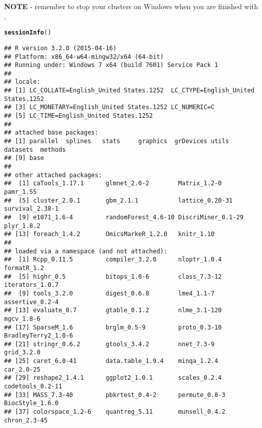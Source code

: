 \documentclass[12pt]{article}\usepackage[]{graphicx}\usepackage[usenames,dvipsnames]{color}
\makeatletter
\newcommand{\hlstd}[1]{\textcolor[rgb]{0.345,0.345,0.345}{#1}}%
\newcommand{\hlkwd}[1]{\textcolor[rgb]{0.737,0.353,0.396}{\textbf{#1}}}%
\newenvironment{kframe}{%
 \def\at@end@of@kframe{}%
 \ifinner\ifhmode%
  \def\at@end@of@kframe{\end{minipage}}%
  \begin{minipage}{\columnwidth}%
 \fi\fi%
 \def\FrameCommand##1{\hskip\@totalleftmargin \hskip-\fboxsep
 \colorbox{shadecolor}{##1}\hskip-\fboxsep
     \hskip-\linewidth \hskip-\@totalleftmargin \hskip\columnwidth}%
 \MakeFramed {\advance\hsize-\width
   \@totalleftmargin\z@ \linewidth\hsize
   \@setminipage}}%
 {\par\unskip\endMakeFramed%
 \at@end@of@kframe}
\newenvironment{knitrout}{}{} %
\makeatother
\begin{document}
\textbf{NOTE} - remember to stop your clusters on Windows when you are finished 
with .

\newpage
\begin{knitrout}
\color{fgcolor}\begin{kframe}
\begin{alltt}
\hlkwd{sessionInfo}\hlstd{()}
\end{alltt}
\begin{verbatim}
## R version 3.2.0 (2015-04-16)
## Platform: x86_64-w64-mingw32/x64 (64-bit)
## Running under: Windows 7 x64 (build 7601) Service Pack 1
## 
## locale:
## [1] LC_COLLATE=English_United States.1252  LC_CTYPE=English_United States.1252   
## [3] LC_MONETARY=English_United States.1252 LC_NUMERIC=C                          
## [5] LC_TIME=English_United States.1252    
## 
## attached base packages:
## [1] parallel  splines   stats     graphics  grDevices utils     datasets  methods  
## [9] base     
## 
## other attached packages:
##  [1] caTools_1.17.1      glmnet_2.0-2        Matrix_1.2-0        pamr_1.55          
##  [5] cluster_2.0.1       gbm_2.1.1           lattice_0.20-31     survival_2.38-1    
##  [9] e1071_1.6-4         randomForest_4.6-10 DiscriMiner_0.1-29  plyr_1.8.2         
## [13] foreach_1.4.2       OmicsMarkeR_1.2.0   knitr_1.10         
## 
## loaded via a namespace (and not attached):
##  [1] Rcpp_0.11.5         compiler_3.2.0      nloptr_1.0.4        formatR_1.2        
##  [5] highr_0.5           bitops_1.0-6        class_7.3-12        iterators_1.0.7    
##  [9] tools_3.2.0         digest_0.6.8        lme4_1.1-7          assertive_0.2-4    
## [13] evaluate_0.7        gtable_0.1.2        nlme_3.1-120        mgcv_1.8-6         
## [17] SparseM_1.6         brglm_0.5-9         proto_0.3-10        BradleyTerry2_1.0-6
## [21] stringr_0.6.2       gtools_3.4.2        nnet_7.3-9          grid_3.2.0         
## [25] caret_6.0-41        data.table_1.9.4    minqa_1.2.4         car_2.0-25         
## [29] reshape2_1.4.1      ggplot2_1.0.1       scales_0.2.4        codetools_0.2-11   
## [33] MASS_7.3-40         pbkrtest_0.4-2      permute_0.8-3       BiocStyle_1.6.0    
## [37] colorspace_1.2-6    quantreg_5.11       munsell_0.4.2       chron_2.3-45
\end{verbatim}
\end{kframe}
\end{knitrout}
\end{document}
